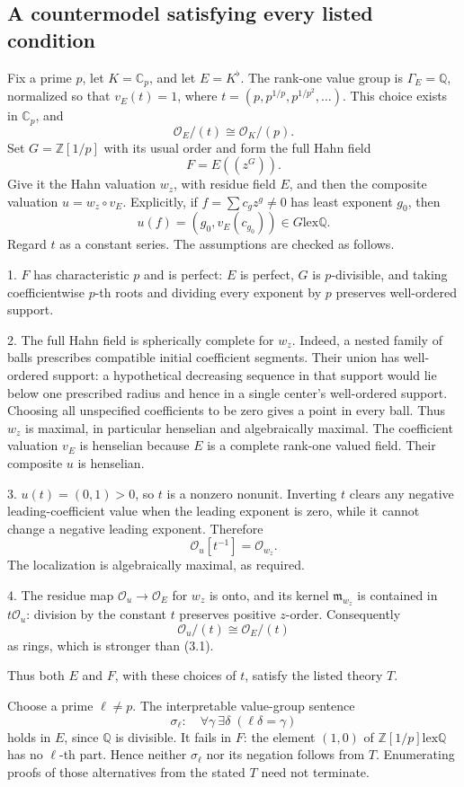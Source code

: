 \documentclass[10pt]{article}
\begin{document}
\subsection*{A countermodel satisfying every listed condition}
Fix a prime \(p\), let \(K=\mathbb C_p\), and let \(E=K^\flat\). The rank-one value group is \(\Gamma_E=\mathbb Q\), normalized so that \(v_E(t)=1\), where \(t=(p,p^{1/p},p^{1/p^2},\ldots)\). This choice exists in \(\mathbb C_p\), and \[\mathcal O_E/(t)\cong\mathcal O_K/(p).\] Set \(G=\mathbb Z[1/p]\) with its usual order and form the full Hahn field \[F=E((z^G)).\] Give it the Hahn valuation \(w_z\), with residue field \(E\), and then the composite valuation \(u=w_z\circ v_E\). Explicitly, if \(f=\sum c_gz^g\neq0\) has least exponent \(g_0\), then \[u(f)=(g_0,v_E(c_{g_0}))\in G\mathbin{\mathrm{lex}}\mathbb Q.
 \tag{3.2}\] Regard \(t\) as a constant series. The assumptions are checked as follows.\par
1. \(F\) has characteristic \(p\) and is perfect: \(E\) is perfect, \(G\) is \(p\)-divisible, and taking coefficientwise \(p\)-th roots and dividing every exponent by \(p\) preserves well-ordered support.\par
2. The full Hahn field is spherically complete for \(w_z\). Indeed, a nested family of balls prescribes compatible initial coefficient segments. Their union has well-ordered support: a hypothetical decreasing sequence in that support would lie below one prescribed radius and hence in a single center’s well-ordered support. Choosing all unspecified coefficients to be zero gives a point in every ball. Thus \(w_z\) is maximal, in particular henselian and algebraically maximal. The coefficient valuation \(v_E\) is henselian because \(E\) is a complete rank-one valued field. Their composite \(u\) is henselian.\par
3. \(u(t)=(0,1)>0\), so \(t\) is a nonzero nonunit. Inverting \(t\) clears any negative leading-coefficient value when the leading exponent is zero, while it cannot change a negative leading exponent. Therefore \[\mathcal O_u[t^{-1}]=\mathcal O_{w_z}.
 \tag{3.3}\] The localization is algebraically maximal, as required.\par
4. The residue map \(\mathcal O_u\longrightarrow\mathcal O_E\) for \(w_z\) is onto, and its kernel \(\mathfrak m_{w_z}\) is contained in \(t\mathcal O_u\): division by the constant \(t\) preserves positive \(z\)-order. Consequently \[\mathcal O_u/(t)\cong\mathcal O_E/(t)
 \tag{3.4}\] as rings, which is stronger than (3.1).\par
Thus both \(E\) and \(F\), with these choices of \(t\), satisfy the listed theory \(T\).\par
Choose a prime \(\ell\neq p\). The interpretable value-group sentence \[\sigma_\ell:\quad
 \forall\gamma\ \exists\delta\;(\ell\delta=\gamma)
 \tag{3.5}\] holds in \(E\), since \(\mathbb Q\) is divisible. It fails in \(F\): the element \((1,0)\) of \(\mathbb Z[1/p]\mathbin{\mathrm{lex}}\mathbb Q\) has no \(\ell\)-th part. Hence neither \(\sigma_\ell\) nor its negation follows from \(T\). Enumerating proofs of those alternatives from the stated \(T\) need not terminate.\par
\end{document}
